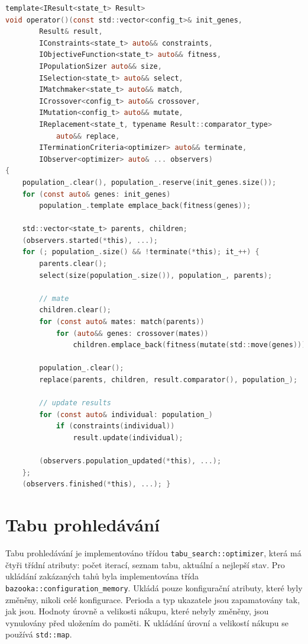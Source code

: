 \begin{lstlisting}[caption={~Implementace genetického algoritmu},label={lst:genetic:algorithm},captionpos=t,abovecaptionskip=-\medskipamount,belowcaptionskip=\medskipamount,language=C]
template<IResult<state_t> Result>
void operator()(const std::vector<config_t>& init_genes,
        Result& result,
        IConstraints<state_t> auto&& constraints,
        IObjectiveFunction<state_t> auto&& fitness,
        IPopulationSizer auto&& size,
        ISelection<state_t> auto&& select,
        IMatchmaker<state_t> auto&& match,
        ICrossover<config_t> auto&& crossover,
        IMutation<config_t> auto&& mutate,
        IReplacement<state_t, typename Result::comparator_type>
            auto&& replace,
        ITerminationCriteria<optimizer> auto&& terminate,
        IObserver<optimizer> auto& ... observers)
{
    population_.clear(), population_.reserve(init_genes.size());
    for (const auto& genes: init_genes)
        population_.template emplace_back(fitness(genes));

    std::vector<state_t> parents, children;
    (observers.started(*this), ...);
    for (; population_.size() && !terminate(*this); it_++) {
        parents.clear();
        select(size(population_.size()), population_, parents);

        // mate
        children.clear();
        for (const auto& mates: match(parents))
            for (auto&& genes: crossover(mates))
                children.emplace_back(fitness(mutate(std::move(genes))));

        population_.clear();
        replace(parents, children, result.comparator(), population_);

        // update results
        for (const auto& individual: population_)
            if (constraints(individual))
                result.update(individual);

        (observers.population_updated(*this), ...);
    };
    (observers.finished(*this), ...); }
\end{lstlisting}

\section{Tabu prohledávání}
Tabu prohledávání je implementováno třídou \texttt{tabu\_search::optimizer}, která má čtyři třídní atributy: počet iterací, seznam tabu, aktuální a nejlepší stav.
Pro ukládání zakázaných tahů byla implementována třída \texttt{bazooka::configuration\_memory}.
Ukládá pouze konfigurační atributy, které byly změněny, nikoli celé konfigurace.
Perioda a typ ukazatele jsou zapamatovány tak, jak jsou.
Hodnoty úrovně a velikosti nákupu, které nebyly změněny, jsou vynulovány před uložením do paměti.
K ukládání úrovní a velikostí nákupu se používá \texttt{std::map}.

